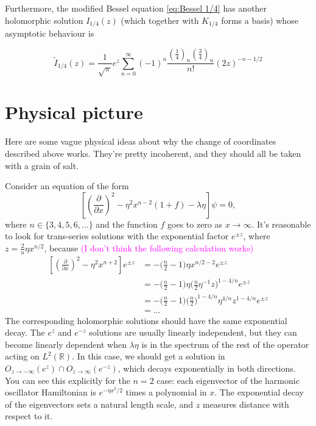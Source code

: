 \documentclass{article}
\theoremstyle{definition}
\theoremstyle{plain}
\begin{document}
Furthermore, the modified Bessel equation \eqref{eq:Bessel 1/4} has another holomorphic solution $I_{1/4}(z)$ (which together with ${K}_{1/4}$ forms a basis) whose asymptotic behaviour is 

\begin{equation}
\tilde{I}_{1/4}(z)=\frac{1}{\sqrt{\pi}}e^{z}\sum_{n= 0}^{\infty}(-1)^n\frac{\left(\frac{1}{4}\right)_n\left(\frac{3}{4}\right)_n}{n!}\left(2z\right)^{-n-1/2}
\end{equation}
\section{Physical picture}
Here are some vague physical ideas about why the change of coordinates described above works. They're pretty incoherent, and they should all be taken with a grain of salt.

Consider an equation of the form
\begin{equation}\label{eq:deformed-airy-lucas}
\left[\left(\frac{\partial}{\partial x}\right)^2-\eta^2x^{n-2}(1 + f) - \lambda\eta\right] \psi = 0,
\end{equation}
where $n \in \{3, 4, 5, 6, \ldots\}$ and the function $f$ goes to zero as $x \to \infty$. It's reasonable to look for trans-series solutions with the exponential factor $e^{\pm z}$, where $z = \tfrac{2}{n} \eta x^{n/2}$,
because \textcolor{magenta}{(I don't think the following calculation works)}
\begin{align*}
\left[\left(\frac{\partial}{\partial x}\right)^2-\eta^2x^{n+2}\right] e^{\pm z} & = -\big(\tfrac{n}{2} - 1\big) \eta x^{n/2 - 2} e^{\pm z} \\
& = -\big(\tfrac{n}{2} - 1\big) \eta \big(\tfrac{n}{2} \eta^{-1} z\big)^{1 - 4/n} e^{\pm z} \\
& = -\big(\tfrac{n}{2} - 1\big) \big(\tfrac{n}{2}\big)^{1- 4/n} \eta^{4/n} z^{1 - 4/n} e^{\pm z} \\
& = \ldots
\end{align*}
The corresponding holomorphic solutions should have the same exponential decay. The $e^z$ and $e^{-z}$ solutions are usually linearly independent, but they can become linearly dependent when $\lambda\eta$ is in the spectrum of the rest of the operator acting on $L^2(\mathbb{R})$. In this case, we should get a solution in $O_{z \to -\infty}(e^z) \cap O_{z \to \infty}(e^{-z})$, which decays exponentially in both directions. You can see this explicitly for the $n = 2$ case: each eigenvector of the harmonic oscillator Hamiltonian is $e^{-\eta x^2/2}$ times a polynomial in $x$. The exponential decay of the eigenvectors sets a natural length scale, and $z$ measures distance with respect to it.
\end{document}
